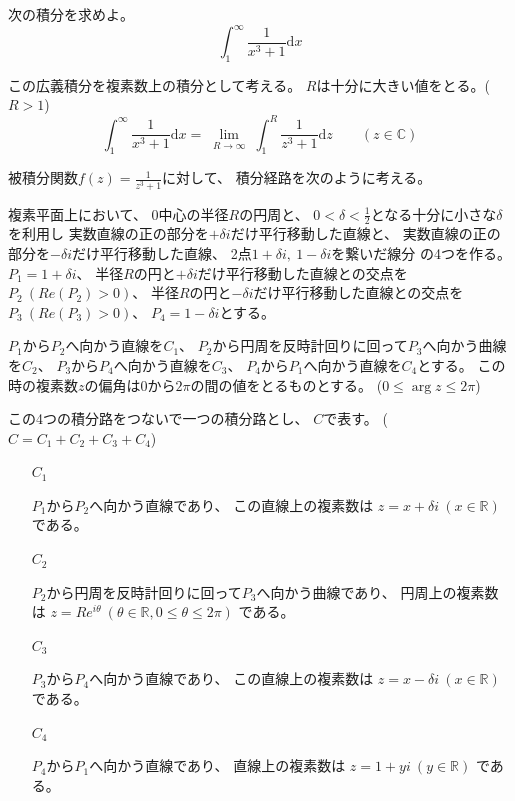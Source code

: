 \documentclass[12pt,b5paper]{ltjsarticle}
\begin{document}
\hrulefill

次の積分を求めよ。
\begin{equation}
 \int_{1}^{\infty} \frac{1}{x^3+1}\mathrm{d}x
\end{equation}

\dotfill

この広義積分を複素数上の積分として考える。
$R$は十分に大きい値をとる。($R>1$)
\begin{equation}
  \int_{1}^{\infty} \frac{1}{x^3+1}\mathrm{d}x
   =
   \lim_{\substack{R \to \infty}}
   \int_{1}^{R} \frac{1}{z^3+1}\mathrm{d}z
  \qquad (z\in\mathbb{C})
\end{equation}

被積分関数$f(z)=\frac{1}{z^3+1}$に対して、
積分経路を次のように考える。

複素平面上において、
$0$中心の半径$R$の円周と、
$0< \delta <\frac{1}{2}$となる十分に小さな$\delta$を利用し
実数直線の正の部分を$+\delta i$だけ平行移動した直線と、
実数直線の正の部分を$-\delta i$だけ平行移動した直線、
2点$1+\delta i,\ 1-\delta i$を繋いだ線分
の4つを作る。
$P_1=1+\delta i$、
半径$R$の円と$+\delta i$だけ平行移動した直線との交点を$P_2\ (Re(P_2)>0)$、
半径$R$の円と$-\delta i$だけ平行移動した直線との交点を$P_3\ (Re(P_3)>0)$、
$P_4=1-\delta i$とする。

$P_1$から$P_2$へ向かう直線を$C_1$、
$P_2$から円周を反時計回りに回って$P_3$へ向かう曲線を$C_2$、
$P_3$から$P_4$へ向かう直線を$C_3$、
$P_4$から$P_1$へ向かう直線を$C_4$とする。
この時の複素数$z$の偏角は$0$から$2\pi$の間の値をとるものとする。
($0 \leq \arg{z} \leq 2\pi$)

この4つの積分路をつないで一つの積分路とし、
$C$で表す。
($C=C_1+C_2+C_3+C_4$)


\begin{enumerate}
 \item [$C_1$]

       $P_1$から$P_2$へ向かう直線であり、
       この直線上の複素数は
       $z=x+\delta i \ (x\in\mathbb{R})$
       である。

 \item [$C_2$]

       $P_2$から円周を反時計回りに回って$P_3$へ向かう曲線であり、
       円周上の複素数は
       $z=Re^{i\theta} \ (\theta\in\mathbb{R},0\leq\theta\leq2\pi)$
       である。

 \item [$C_3$]

       $P_3$から$P_4$へ向かう直線であり、
       この直線上の複素数は
       $z=x-\delta i \ (x\in\mathbb{R})$
       である。

 \item [$C_4$]

       $P_4$から$P_1$へ向かう直線であり、
       直線上の複素数は
       $z=1+ yi \ (y\in\mathbb{R})$
       である。

\end{enumerate}
\end{document}
